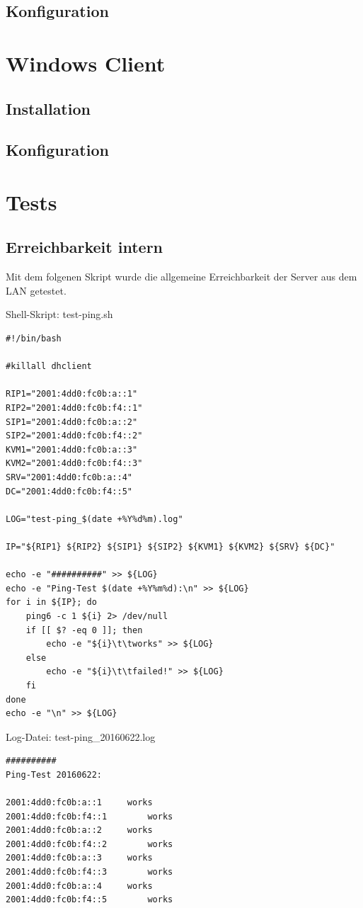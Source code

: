 \subsection{Konfiguration}\section{Windows Client}

\subsection{Installation}
\subsection{Konfiguration}\section{Tests}

\subsection{Erreichbarkeit intern}

Mit dem folgenen Skript wurde die allgemeine Erreichbarkeit der Server aus dem LAN getestet.

Shell-Skript: {\sc test-ping.sh}
\begin{lstlisting}
#!/bin/bash

#killall dhclient

RIP1="2001:4dd0:fc0b:a::1"
RIP2="2001:4dd0:fc0b:f4::1"
SIP1="2001:4dd0:fc0b:a::2"
SIP2="2001:4dd0:fc0b:f4::2"
KVM1="2001:4dd0:fc0b:a::3"
KVM2="2001:4dd0:fc0b:f4::3"
SRV="2001:4dd0:fc0b:a::4"
DC="2001:4dd0:fc0b:f4::5"

LOG="test-ping_$(date +%Y%d%m).log"

IP="${RIP1} ${RIP2} ${SIP1} ${SIP2} ${KVM1} ${KVM2} ${SRV} ${DC}"

echo -e "##########" >> ${LOG}
echo -e "Ping-Test $(date +%Y%m%d):\n" >> ${LOG}
for i in ${IP}; do
	ping6 -c 1 ${i} 2> /dev/null
	if [[ $? -eq 0 ]]; then
		echo -e "${i}\t\tworks" >> ${LOG}
	else
		echo -e "${i}\t\tfailed!" >> ${LOG}
	fi
done	
echo -e "\n" >> ${LOG}
\end{lstlisting}

Log-Datei: {\sc test-ping_20160622.log}
\begin{lstlisting}
##########
Ping-Test 20160622:

2001:4dd0:fc0b:a::1		works
2001:4dd0:fc0b:f4::1		works
2001:4dd0:fc0b:a::2		works
2001:4dd0:fc0b:f4::2		works
2001:4dd0:fc0b:a::3		works
2001:4dd0:fc0b:f4::3		works
2001:4dd0:fc0b:a::4		works
2001:4dd0:fc0b:f4::5		works
\end{lstlisting}

